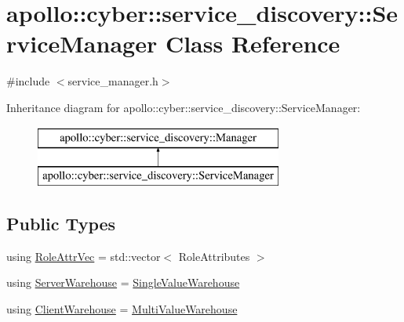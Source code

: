 \hypertarget{classapollo_1_1cyber_1_1service__discovery_1_1ServiceManager}{\section{apollo\-:\-:cyber\-:\-:service\-\_\-discovery\-:\-:Service\-Manager Class Reference}
\label{classapollo_1_1cyber_1_1service__discovery_1_1ServiceManager}
}


{\ttfamily \#include $<$service\-\_\-manager.\-h$>$}

Inheritance diagram for apollo\-:\-:cyber\-:\-:service\-\_\-discovery\-:\-:Service\-Manager\-:\begin{figure}[H]
\begin{center}
\leavevmode
\includegraphics[height=2.000000cm]{classapollo_1_1cyber_1_1service__discovery_1_1ServiceManager}
\end{center}
\end{figure}
\subsection*{Public Types}
\begin{DoxyCompactItemize}
\item 
using \hyperlink{classapollo_1_1cyber_1_1service__discovery_1_1ServiceManager_a1174fd4b721d2e18eb30b9e1530109b1}{Role\-Attr\-Vec} = std\-::vector$<$ Role\-Attributes $>$
\item 
using \hyperlink{classapollo_1_1cyber_1_1service__discovery_1_1ServiceManager_a23a901a01fc5e61a4f6cc9aaac84dd24}{Server\-Warehouse} = \hyperlink{classapollo_1_1cyber_1_1service__discovery_1_1SingleValueWarehouse}{Single\-Value\-Warehouse}
\item 
using \hyperlink{classapollo_1_1cyber_1_1service__discovery_1_1ServiceManager_af4e900ffa8e34995b8a6bca9bdfc6f9d}{Client\-Warehouse} = \hyperlink{classapollo_1_1cyber_1_1service__discovery_1_1MultiValueWarehouse}{Multi\-Value\-Warehouse}
\end{DoxyCompactItemize}
